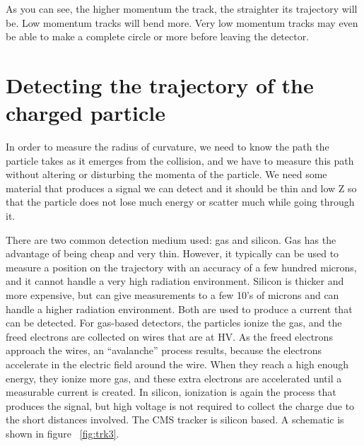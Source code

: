 As you can see, the higher momentum the track, the straighter its trajectory will be.  Low momentum tracks will bend more.  Very low momentum tracks may even be able to make a complete circle or more before leaving the detector. 

\section{Detecting the trajectory of the charged particle}
In order to measure the radius of curvature, we need to know the path the particle takes as it emerges from the collision, and we have to measure this path without altering or disturbing the momenta of the particle.  We need some material that produces a signal we can detect and it should be thin and low Z so that the particle does not lose much energy or scatter much while going through it. 
 
There are two common detection medium used: gas and silicon.  Gas has the advantage of being cheap and very thin.  However, it typically can be used to measure a position on the trajectory with an accuracy of a few hundred microns, and it cannot handle a very high radiation environment.  Silicon is thicker and more expensive, but can give measurements to a few 10's of microns and can handle a higher radiation environment.  Both are used to produce a current that can be detected.  For gas-based detectors, the particles ionize the gas, and the freed electrons are collected on wires that are at HV.  As the freed electrons approach the wires, an ``avalanche''  process results, because the electrons accelerate in the electric field around the wire.  When they reach a high enough energy, they ionize more gas, and these extra electrons are accelerated until a measurable current is created. In silicon, ionization is again the process that produces the signal, but high voltage is not required to collect the charge due to the short distances involved.
\noindent
The CMS tracker is silicon based.  A schematic is shown in figure ~\ref{fig:trk3}.

